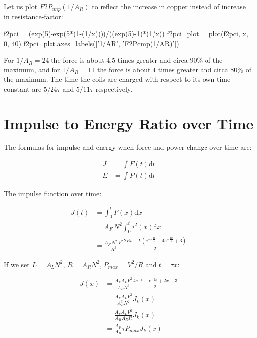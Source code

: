 \documentclass[]{elementary-physics}
\begin{document}
Let us plot $F2P_{cmp}(1/A_R)$ to reflect the increase in copper instead of increase in resistance-factor:

\begin{sagesilent}
f2pci = (exp(5)-exp(5*(1-(1/x))))/((exp(5)-1)*(1/x))
f2pci_plot = plot(f2pci, x, 0, 40)
f2pci_plot.axes_labels(['1/AR', 'F2Pcmp(1/AR)'])
\end{sagesilent}


For $1/A_R = 24$ the force is about $4.5$ times greater and circa $90 \percent$ of the maximum, and for $1/A_R = 11$ the force is about $4$ times greater and circa $80 \percent$ of the maximum. The time the coils are charged with respect to its own time-constant are $5/24 \tau$ and $5/11 \tau$ respectively.

\section{Impulse to Energy Ratio over Time}

The formulas for impulse and energy when force and power change over time are:

\begin{subequations}
\begin{align}
J &= \int F(t) \mathrm{d}t \\
E &= \int P(t) \mathrm{d}t
\end{align}
\end{subequations}

The impulse function over time:

\begin{subequations}
\begin{align}
J(t) &= \int^t_0 F(x) \mathrm{d}x \\
&= A_F \, N^2 \int^t_0 i^2(x) \mathrm{d}x \\
&= \frac{A_F \, N^2 \, V^2}{R^3} \frac{2 R t - L (e^{-2 \frac{R t}{L}} - 4 e^{-\frac{R t}{L}} + 3)}{2}
\end{align}
\end{subequations}

If we set $L = A_L N^2$, $R = A_R N^2$, $P_{max} = V^2 / R$ and $t = \tau x$:

\begin{subequations}
\begin{align}
J(x) &= \frac{A_F A_L V^2}{A_R N^3} \frac{4 e^{-x}-e^{-2x}+2x-3}{2} \\
&= \frac{A_F A_L V^2}{A_R^3 N^2} J_k(x) \\
&= \frac{A_F A_L V^2}{A_R A_R R} J_k(x) \\
&= \frac{A_F}{A_R} \tau P_{max} J_k(x)
\end{align}
\end{subequations}
\end{document}
